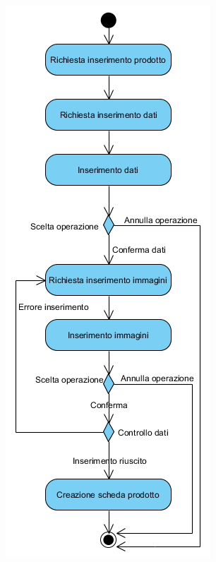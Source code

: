 \begin{center}
	\includegraphics[width=\textwidth]{assets/visualParadigm/attivita/schedaprodotto}
\end{center}

